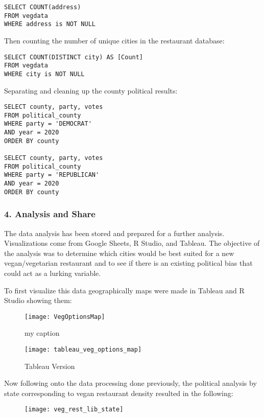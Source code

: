 \documentclass[
]{article}
\begin{document}
\begin{verbatim}
SELECT COUNT(address)
FROM vegdata
WHERE address is NOT NULL
\end{verbatim}

Then counting the number of unique cities in the restaurant database:

\begin{verbatim}
SELECT COUNT(DISTINCT city) AS [Count]
FROM vegdata
WHERE city is NOT NULL
\end{verbatim}

Separating and cleaning up the county political results:

\begin{verbatim}
SELECT county, party, votes
FROM political_county
WHERE party = 'DEMOCRAT'
AND year = 2020
ORDER BY county

SELECT county, party, votes
FROM political_county
WHERE party = 'REPUBLICAN'
AND year = 2020
ORDER BY county
\end{verbatim}

\subsubsection{4. Analysis and Share}\label{analysis-and-share}

The data analysis has been stored and prepared for a further analysis.
Visualizations come from Google Sheets, R Studio, and Tableau. The
objective of the analysis was to determine which cities would be best
suited for a new vegan/vegetarian restaurant and to see if there is an
existing political bias that could act as a lurking variable.

To first visualize this data geographically maps were made in Tableau
and R Studio showing them:

\begin{figure}
\texttt{[image: VegOptionsMap]} \caption{my caption}\label{fig:figurename}
\end{figure}

\begin{figure}
\texttt{[image: tableau\_veg\_options\_map]} \caption{Tableau Version}\label{fig:figurename2}
\end{figure}

Now following onto the data processing done previously, the political
analysis by state corresponding to vegan restaurant density resulted in
the following:

\begin{figure}
\texttt{[image: veg\_rest\_lib\_state]} \end{figure}
\end{document}
